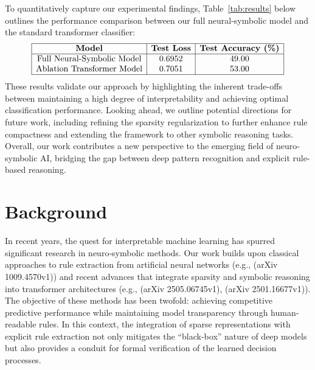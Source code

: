 \documentclass{article}
\begin{document}
To quantitatively capture our experimental findings, Table~\ref{tab:results} below outlines the performance comparison between our full neural-symbolic model and the standard transformer classifier:
\[
\begin{array}{|c|c|c|}
\hline
\textbf{Model} & \textbf{Test Loss} & \textbf{Test Accuracy (\%)} \\
\hline
\text{Full Neural-Symbolic Model} & 0.6952 & 49.00 \\
\text{Ablation Transformer Model} & 0.7051 & 53.00 \\
\hline
\end{array}
\]
These results validate our approach by highlighting the inherent trade-offs between maintaining a high degree of interpretability and achieving optimal classification performance. Looking ahead, we outline potential directions for future work, including refining the sparsity regularization to further enhance rule compactness and extending the framework to other symbolic reasoning tasks. Overall, our work contributes a new perspective to the emerging field of neuro-symbolic AI, bridging the gap between deep pattern recognition and explicit rule-based reasoning.

\section{Background}
In recent years, the quest for interpretable machine learning has spurred significant research in neuro‐symbolic methods. Our work builds upon classical approaches to rule extraction from artificial neural networks (e.g., (arXiv 1009.4570v1)) and recent advances that integrate sparsity and symbolic reasoning into transformer architectures (e.g., (arXiv 2505.06745v1), (arXiv 2501.16677v1)). The objective of these methods has been twofold: achieving competitive predictive performance while maintaining model transparency through human‐readable rules. In this context, the integration of sparse representations with explicit rule extraction not only mitigates the “black-box” nature of deep models but also provides a conduit for formal verification of the learned decision processes.
\end{document}
